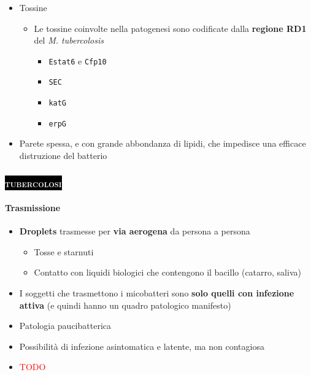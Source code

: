\documentclass[italian,]{article}
\providecommand{\tightlist}{%
  \setlength{\itemsep}{0pt}\setlength{\parskip}{0pt}}
\newcommand{\pat}[1]{\colorbox{black}{\textcolor{white}{\textsc{#1}}}}
\newcommand{\TODO}[1]{\textcolor{red}{\textsf{\footnotesize{TODO #1}}}} %
\begin{document}
\begin{itemize}
\tightlist
\item
  Tossine

  \begin{itemize}
  \tightlist
  \item
    Le tossine coinvolte nella patogenesi sono codificate dalla
    \textbf{regione RD1} del \emph{M. tubercolosis}

    \begin{itemize}
    \tightlist
    \item
      \texttt{Estat6} e \texttt{Cfp10}
    \item
      \texttt{SEC}
    \item
      \texttt{katG}
    \item
      \texttt{erpG}
    \end{itemize}
  \end{itemize}
\item
  Parete spessa, e con grande abbondanza di lipidi, che impedisce una
  efficace distruzione del batterio
\end{itemize}

\hypertarget{section-11}{%
\subsubsection{\texorpdfstring{\pat{tubercolosi}}{}}\label{section-11}}

\hypertarget{trasmissione}{%
\paragraph{Trasmissione}\label{trasmissione}}

\begin{itemize}
\item
  \textbf{Droplets} trasmesse per \textbf{via aerogena} da persona a
  persona

  \begin{itemize}
  \tightlist
  \item
    Tosse e starnuti
  \item
    Contatto con liquidi biologici che contengono il bacillo (catarro,
    saliva)
  \end{itemize}
\item
  I soggetti che trasmettono i micobatteri sono \textbf{solo quelli con
  infezione attiva} (e quindi hanno un quadro patologico manifesto)
\item
  Patologia paucibatterica
\item
  Possibilità di infezione asintomatica e latente, ma non contagiosa
\item
  \TODO{}
\end{itemize}
\end{document}

